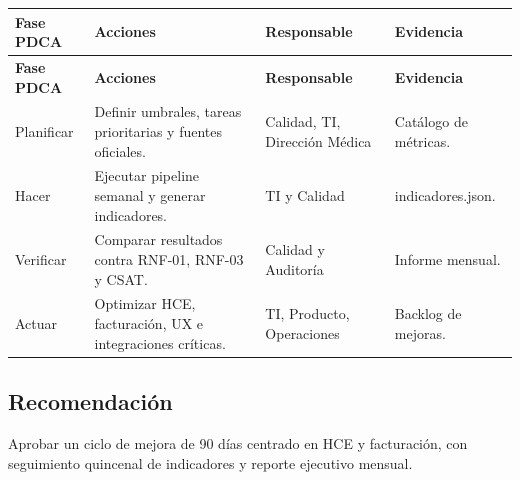 \documentclass[11pt]{article}
\begin{document}
\small
\begin{longtable}{p{} p{} p{} p{}}
\toprule
\textbf{Fase PDCA} & \textbf{Acciones} & \textbf{Responsable} & \textbf{Evidencia} \\
\midrule
\endfirsthead
\toprule
\textbf{Fase PDCA} & \textbf{Acciones} & \textbf{Responsable} & \textbf{Evidencia} \\
\midrule
\endhead
Planificar & Definir umbrales, tareas prioritarias y fuentes oficiales. & Calidad, TI, Dirección Médica & Catálogo de métricas. \\
Hacer & Ejecutar pipeline semanal y generar indicadores. & TI y Calidad & indicadores.json. \\
Verificar & Comparar resultados contra RNF-01, RNF-03 y CSAT. & Calidad y Auditoría & Informe mensual. \\
Actuar & Optimizar HCE, facturación, UX e integraciones críticas. & TI, Producto, Operaciones & Backlog de mejoras. \\
\bottomrule
\end{longtable}
\normalsize

\subsection*{Recomendación}
Aprobar un ciclo de mejora de 90 días centrado en HCE y facturación, con seguimiento quincenal de indicadores y reporte ejecutivo mensual.
\end{document}
